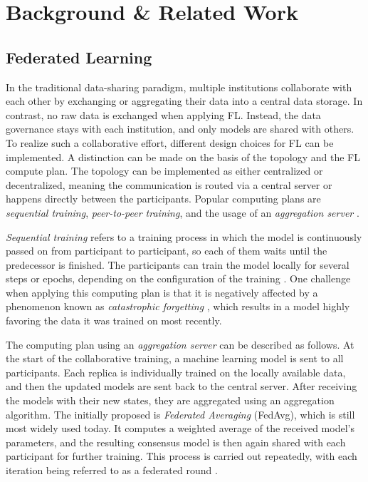 \section{Background \& Related Work}
\label{sec:RelatedWork}

\subsection{Federated Learning}
\label{subsec:FederatedLearning}

In the traditional data-sharing paradigm, multiple institutions collaborate with each other by exchanging or aggregating their data into a central data storage. In contrast, no raw data is exchanged when applying FL. Instead, the data governance stays with each institution, and only models are shared with others.
To realize such a collaborative effort, different design choices for FL can be implemented. A distinction can be made on the basis of the topology and the FL compute plan. The topology can be implemented as either centralized or decentralized, meaning the communication is routed via a central server or happens directly between the participants. Popular computing plans are \textit{sequential training}, \textit{peer-to-peer training}, and the usage of an \textit{aggregation server} \citep{Rieke2020TheLearning}.

\textit{Sequential training} refers to a training process in which the model is continuously passed on from participant to participant, so each of them waits until the predecessor is finished. The participants can train the model locally for several steps or epochs, depending on the configuration of the training \citep{Chang2018DistributedImaging}. One challenge when applying this computing plan is that it is negatively affected by a phenomenon known as \textit{catastrophic forgetting} \citep{French1999CatastrophicNetworks}, which results in a model highly favoring the data it was trained on most recently.

The computing plan using an \textit{aggregation server} can be described as follows. At the start of the collaborative training, a machine learning model is sent to all participants. Each replica is individually trained on the locally available data, and then the updated models are sent back to the central server. After receiving the models with their new states, they are aggregated using an aggregation algorithm. The initially proposed is \textit{Federated Averaging} (FedAvg), which is still most widely used today. It computes a weighted average of the received model's parameters, and the resulting consensus model is then again shared with each participant for further training. This process is carried out repeatedly, with each iteration being referred to as a federated round \citep{BrendanMcMahan2017}.

